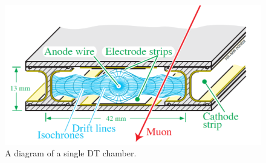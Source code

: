 \begin{figure}[H]
    \centering
    \includegraphics[width=1\textwidth]{Images/CMS/DTDiagram.png}
    \caption{A diagram of a single DT chamber.}
    \label{fig:DTDiagram}
\end{figure}